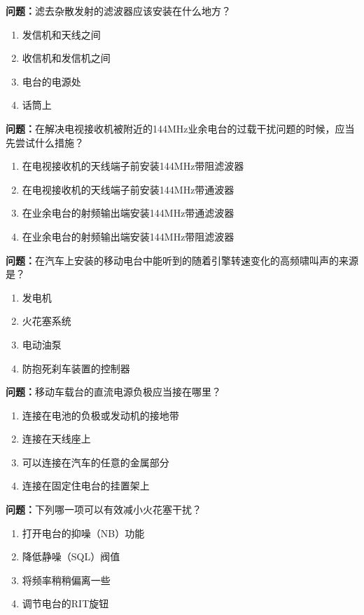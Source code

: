\bigskip


\noindent\textbf{问题：}滤去杂散发射的滤波器应该安装在什么地方？
\begin{enumerate}[label=\Alph*), leftmargin=3em]
	\item 发信机和天线之间
	\item 收信机和发信机之间
	\item 电台的电源处
	\item 话筒上
\end{enumerate}

\bigskip


\noindent\textbf{问题：}在解决电视接收机被附近的144MHz业余电台的过载干扰问题的时候，应当先尝试什么措施？
\begin{enumerate}[label=\Alph*), leftmargin=3em]
	\item 在电视接收机的天线端子前安装144MHz带阻滤波器
	\item 在电视接收机的天线端子前安装144MHz带通波器
	\item 在业余电台的射频输出端安装144MHz带通滤波器
	\item 在业余电台的射频输出端安装144MHz带阻滤波器
\end{enumerate}

\bigskip


\noindent\textbf{问题：}在汽车上安装的移动电台中能听到的随着引擎转速变化的高频啸叫声的来源是？
\begin{enumerate}[label=\Alph*), leftmargin=3em]
	\item 发电机
	\item 火花塞系统
	\item 电动油泵
	\item 防抱死刹车装置的控制器
\end{enumerate}

\bigskip


\noindent\textbf{问题：}移动车载台的直流电源负极应当接在哪里？
\begin{enumerate}[label=\Alph*), leftmargin=3em]
	\item 连接在电池的负极或发动机的接地带
	\item 连接在天线座上
	\item 可以连接在汽车的任意的金属部分
	\item 连接在固定住电台的挂置架上
\end{enumerate}

\bigskip


\noindent\textbf{问题：}下列哪一项可以有效减小火花塞干扰？
\begin{enumerate}[label=\Alph*), leftmargin=3em]
	\item 打开电台的抑噪（NB）功能
	\item 降低静噪（SQL）阀值
	\item 将频率稍稍偏离一些
	\item 调节电台的RIT旋钮
\end{enumerate}


